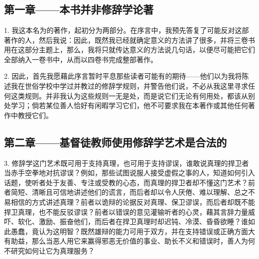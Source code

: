 \section{}


\subsection{第一章——本书并非修辞学论著}

1. 我这本名为的著作，起初分为两部分。在序言中，我预先答复了可能反对这部著作的人，然后我说：因此，既然我已经就确定意义的方法讲了很多，并将三卷书用在这部分主题上，那么，我将只就传达意义的方法说几句话，以便尽可能把它们全部纳入一卷书中，从而以四卷书完成整部著作。\par

2. 因此，首先我愿藉此序言暂时平息那些读者可能有的期待——他们以为我将陈述我在世俗学校中学过并教过的修辞学规则，并警告他们说，不必从我这里寻求任何这类规则。并非我认为这些规则一无是处，而是说它们无论有何用处，都该从别处学习；倘若某位善人恰好有闲暇学习它们，他不可要求我在本著作或其他任何著作中教授它们。\par


\subsection{第二章——基督徒教师使用修辞学艺术是合法的}

3. 修辞学这门艺术既可用于支持真理，也可用于支持谬误，谁敢说真理的捍卫者当赤手空拳地对抗谬误？例如，那些试图说服人接受虚假之事的人，知道如何引入话题，使听者处于友善、专注或受教的心态，而真理的捍卫者却不懂这门艺术？前者简短、清晰且可信地讲述他们的谎言，而后者却以令人厌倦、难以理解、总之不易相信的方式讲述真理？前者以诡辩的论据反对真理、保卫谬误，而后者却既不能捍卫真理，也不能反驳谬误？前者以错误的意见灌输听者的心灵，藉其言辞力量威吓、软化、激励、振奋他们，而后者在捍卫真理时却迟钝、冷漠、昏昏欲睡？谁如此愚蠢，竟认为这明智？既然雄辩的能力可用于双方，并在支持错误或正确方面大有助益，那么当恶人用它来赢得邪恶无价值的事业、助长不义和错误时，善人为何不研究如何让它为真理服务？\par

